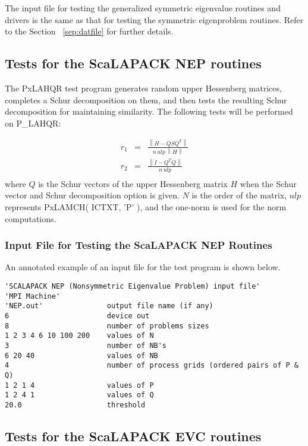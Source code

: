 \documentclass[11pt]{report}
\newcommand{\dent}{\hspace*{\parindent}}
\newcommand{\leftnorm}{\left\|}
\newcommand{\rightnorm}{\right\|}
\begin{document}
\dent
The input file for testing the generalized symmetric
eigenvalue routines and drivers is the same as that for testing
the symmetric eigenproblem routines.  Refer to the Section ~\ref{sep:datfile}
for further details.

\subsection{Tests for the ScaLAPACK NEP routines}

The PxLAHQR test program generates random upper Hessenberg matrices,
completes a Schur decomposition on them, and then tests the resulting
Schur decomposition for maintaining similarity.
The following tests will be performed on P\_LAHQR:

\begin{eqnarray}
          r_1&=&\frac{\leftnorm H - Q S Q^T \rightnorm}
                {n \, ulp \, \leftnorm H \rightnorm} \nonumber\\[1ex]
          r_2&=&\frac{\leftnorm I - Q^T Q \rightnorm}
                 {n \, ulp } \nonumber\\[1ex]
\end{eqnarray}
where $Q$ is the Schur vectors of the upper Hessenberg matrix $H$ when
the Schur vector and Schur decomposition option is given.  $N$ is the
order of the matrix, $ulp$ represents PxLAMCH( ICTXT, 'P' ), and the
one-norm is used for the norm computations.

\subsubsection{Input File for Testing the ScaLAPACK NEP Routines}
\dent
An annotated example of an input file for the
test program is shown below.

\begin{verbatim}
'SCALAPACK NEP (Nonsymmetric Eigenvalue Problem) input file'
'MPI Machine'
'NEP.out'               output file name (if any)
6                       device out
8                       number of problems sizes
1 2 3 4 6 10 100 200    values of N
3                       number of NB's
6 20 40                 values of NB
4                       number of process grids (ordered pairs of P & Q)
1 2 1 4                 values of P
1 2 4 1                 values of Q
20.0                    threshold
\end{verbatim}

\subsection{Tests for the ScaLAPACK EVC routines}
\end{document}
